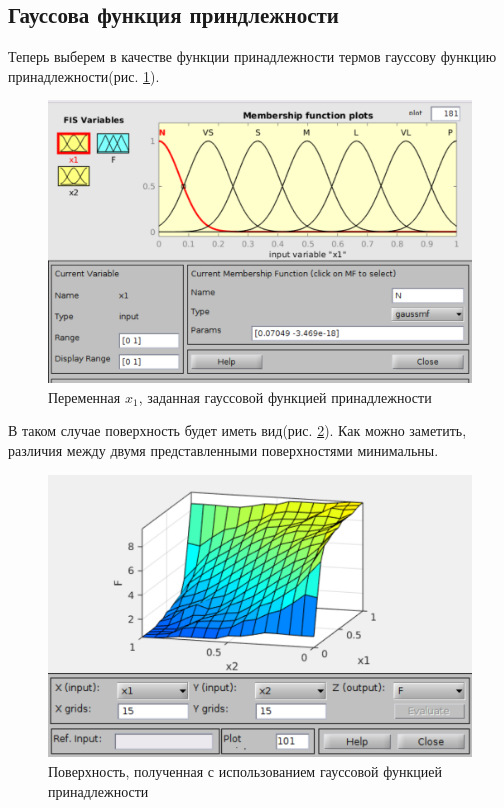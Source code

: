 \documentclass[11pt,a4paper]{report}
\newcommand{\insref}[1]{рис. \ref{#1}}
\begin{document}
	\subsection{Гауссова функция приндлежности}
	Теперь выберем в качестве функции принадлежности термов гауссову функцию принадлежности(\insref{fig:gaussmf}).
	\begin{figure}[!hbtp]
		\centering
		\includegraphics[width=\linewidth]{gaussmf.png}
		\caption{Переменная $x_1$, заданная гауссовой функцией принадлежности}
		\label{fig:gaussmf}
	\end{figure}
	В таком случае поверхность будет иметь вид(\insref{fig:gauss_surf}). Как можно заметить, различия между двумя представленными поверхностями минимальны.
	\begin{figure}[!hbtp]
		\centering
		\includegraphics[width=\linewidth]{gauss_surf.png}
		\caption{Поверхность, полученная с использованием гауссовой функцией принадлежности}
		\label{fig:gauss_surf}
	\end{figure}
\end{document}
